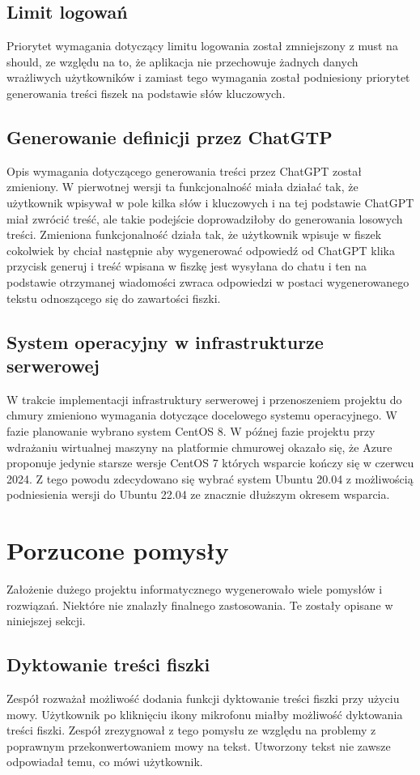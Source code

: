 \subsection{Limit logowań}
Priorytet wymagania dotyczący limitu logowania został zmniejszony z must na should, ze względu na to, że aplikacja nie przechowuje żadnych danych wrażliwych użytkowników i zamiast tego wymagania został podniesiony priorytet generowania treści fiszek na podstawie słów kluczowych.

\subsection{Generowanie definicji przez ChatGTP}
Opis wymagania dotyczącego generowania treści przez ChatGPT został zmieniony. W pierwotnej wersji ta funkcjonalność miała działać tak, że użytkownik wpisywał w pole kilka słów i kluczowych i na tej podstawie ChatGPT miał zwrócić treść, ale takie podejście doprowadziłoby do generowania losowych treści. Zmieniona funkcjonalność działa tak, że użytkownik wpisuje w fiszek cokolwiek by chciał następnie aby wygenerować odpowiedź od ChatGPT klika przycisk generuj i treść wpisana w fiszkę jest wysyłana do chatu i ten na podstawie otrzymanej wiadomości zwraca odpowiedzi w postaci wygenerowanego tekstu odnoszącego się do zawartości fiszki.

\subsection{System operacyjny w infrastrukturze serwerowej}
W trakcie implementacji infrastruktury serwerowej i przenoszeniem projektu do chmury zmieniono wymagania dotyczące docelowego systemu operacyjnego. W fazie planowanie wybrano system CentOS 8. W późnej fazie projektu przy wdrażaniu wirtualnej maszyny na platformie chmurowej okazało się, że Azure proponuje jedynie starsze wersje CentOS 7 których wsparcie kończy się w czerwcu 2024. Z tego powodu zdecydowano się wybrać system Ubuntu 20.04 z możliwością podniesienia wersji do Ubuntu 22.04 ze znacznie dłuższym okresem wsparcia.


\section{Porzucone pomysły}
Założenie dużego projektu informatycznego wygenerowało wiele pomysłów i rozwiązań. Niektóre nie znalazły finalnego zastosowania. Te zostały opisane w niniejszej sekcji.

\subsection{Dyktowanie treści fiszki}
Zespół rozważał możliwość dodania funkcji dyktowanie treści fiszki przy użyciu mowy. Użytkownik po kliknięciu ikony mikrofonu miałby możliwość dyktowania treści fiszki. Zespół zrezygnował z tego pomysłu ze względu na problemy z poprawnym przekonwertowaniem mowy na tekst. Utworzony tekst nie zawsze odpowiadał temu, co mówi użytkownik.

